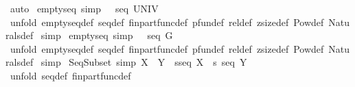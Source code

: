 \begin{isabellebody}
\isamarkupfalse%
\ auto\isanewline
{}\isamarkupfalse%
%
\endisatagproof
{\isafoldproof}%
%
\isadelimproof
\isanewline
%
\endisadelimproof
\isanewline
{}\isamarkupfalse%
\ empty{\isacharunderscore}seq\ {\isacharbrackleft}simp{\isacharbrackright}{\isacharcolon}\ {\isachardoublequoteopen}{\isacharpercent}{\isacharless}{\isacharpercent}{\isachargreater}\ {\isacharcolon}\ seq\ UNIV{\isachardoublequoteclose}\isanewline
%
\isadelimproof
%
\endisadelimproof
%
\isatagproof
{}\isamarkupfalse%
\ {\isacharparenleft}unfold\ emptyseq{\isacharunderscore}def\ seq{\isacharunderscore}def\ fin{\isacharunderscore}part{\isacharunderscore}func{\isacharunderscore}def\ pfun{\isacharunderscore}def\ rel{\isacharunderscore}def\ zsize{\isacharunderscore}def\ Pow{\isacharunderscore}def\ Naturals{\isacharunderscore}def{\isacharparenright}\isanewline
{}\isamarkupfalse%
\ simp\isanewline
{}\isamarkupfalse%
%
\endisatagproof
{\isafoldproof}%
%
\isadelimproof
\isanewline
%
\endisadelimproof
\isanewline
\isanewline
{}\isamarkupfalse%
\ empty{\isacharunderscore}seq{}\ {\isacharbrackleft}simp{\isacharbrackright}{\isacharcolon}\ {\isachardoublequoteopen}{\isacharpercent}{\isacharless}{\isacharpercent}{\isachargreater}\ {\isacharcolon}\ seq\ G{\isachardoublequoteclose}\isanewline
%
\isadelimproof
%
\endisadelimproof
%
\isatagproof
{}\isamarkupfalse%
\ {\isacharparenleft}unfold\ emptyseq{\isacharunderscore}def\ seq{\isacharunderscore}def\ fin{\isacharunderscore}part{\isacharunderscore}func{\isacharunderscore}def\ pfun{\isacharunderscore}def\ rel{\isacharunderscore}def\ zsize{\isacharunderscore}def\ Pow{\isacharunderscore}def\ Naturals{\isacharunderscore}def{\isacharparenright}\isanewline
{}\isamarkupfalse%
\ simp\isanewline
{}\isamarkupfalse%
%
\endisatagproof
{\isafoldproof}%
%
\isadelimproof
\isanewline
%
\endisadelimproof
\isanewline
{}\isamarkupfalse%
\ Seq{\isacharunderscore}Subset\ {\isacharbrackleft}simp{\isacharbrackright}{\isacharcolon}\ {\isachardoublequoteopen}{\isacharbrackleft}{\isacharbar}X\ {\isacharless}{\isacharequal}\ Y\ {\isacharsemicolon}\ s{\isacharcolon}seq\ X{\isacharbar}{\isacharbrackright}\ {\isacharequal}{\isacharequal}{\isachargreater}\ s{\isacharcolon}\ seq\ Y{\isachardoublequoteclose}\isanewline
%
\isadelimproof
%
\endisadelimproof
%
\isatagproof
{}\isamarkupfalse%
\ {\isacharparenleft}unfold\ seq{\isacharunderscore}def\ fin{\isacharunderscore}part{\isacharunderscore}func{\isacharunderscore}def{\isacharparenright}\isanewline

\end{isabellebody}
